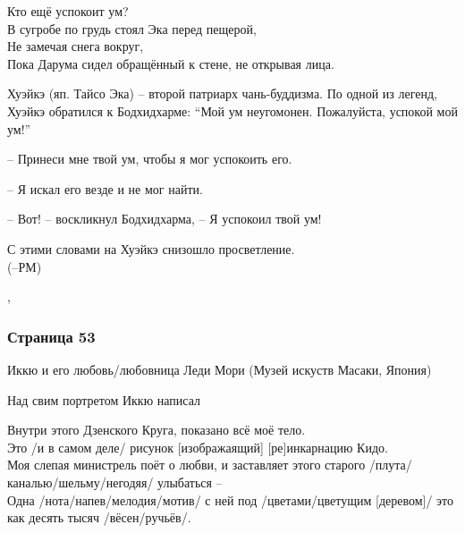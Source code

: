 \begin{ver}[2]
  \begin{verses}
    Кто ещё успокоит ум?\\
    В сугробе по грудь стоял Эка перед пещерой,\\
    Не замечая снега вокруг,\\
    Пока Дарума сидел обращённый к стене, не открывая лица.
  \end{verses}
\end{ver}     

\begin{ver}[1]
Хуэйкэ (яп. Тайсо Эка) -- второй патриарх чань-буддизма.
По одной из легенд, Хуэйкэ обратился к Бодхидхарме: ``Мой ум
неугомонен. Пожалуйста, успокой мой ум!''

-- Принеси мне твой ум, чтобы я мог успокоить его. 

-- Я искал его везде и не мог найти.

-- Вот! -- воскликнул Бодхидхарма, -- Я успокоил твой ум!

С этими словами на Хуэйкэ снизошло просветление.\\
(--РМ)
\end{ver}
\sep

\subsubsection{Страница 53}
\begin{ver}
Иккю и его любовь/любовница Леди Мори (Музей искуств Масаки, Япония)
\end{ver}

\begin{ver}
Над свим портретом Иккю написал
\end{ver}

\begin{ver}
  \begin{verses}
    Внутри этого Дзенского Круга, показано всё моё
    тело.\\ 
    Это /и в самом деле/ рисунок [изображаящий]
    [ре]инкарнацию Кидо.\\
    Моя слепая министрель поёт о любви, и заставляет этого старого
    /плута/каналью/шельму/негодяя/ улыбаться --\\
    Одна /нота/напев/мелодия/мотив/ с ней под
    /цветами/цветущим [деревом]/ это как десять тысяч
    /вёсен/ручьёв/.  
  \end{verses}
\end{ver}

